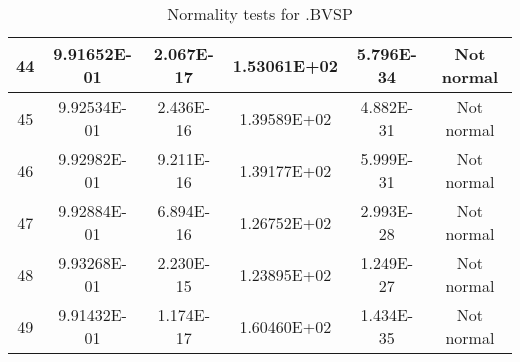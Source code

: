 \begin{table}[h]
\begin{tabular}{|c|c|c|c|c|c|}
		44 & 9.91652E-01 & 2.067E-17 & 1.53061E+02 & 5.796E-34 & Not normal\\\hline
		45 & 9.92534E-01 & 2.436E-16 & 1.39589E+02 & 4.882E-31 & Not normal\\\hline
		46 & 9.92982E-01 & 9.211E-16 & 1.39177E+02 & 5.999E-31 & Not normal\\\hline
		47 & 9.92884E-01 & 6.894E-16 & 1.26752E+02 & 2.993E-28 & Not normal\\\hline
		48 & 9.93268E-01 & 2.230E-15 & 1.23895E+02 & 1.249E-27 & Not normal\\\hline
		49 & 9.91432E-01 & 1.174E-17 & 1.60460E+02 & 1.434E-35 & Not normal\\\hline
	\end{tabular}
	\caption{Normality tests for .BVSP}
	\label{tab:normality_tests_BVSP}
\end{table}
